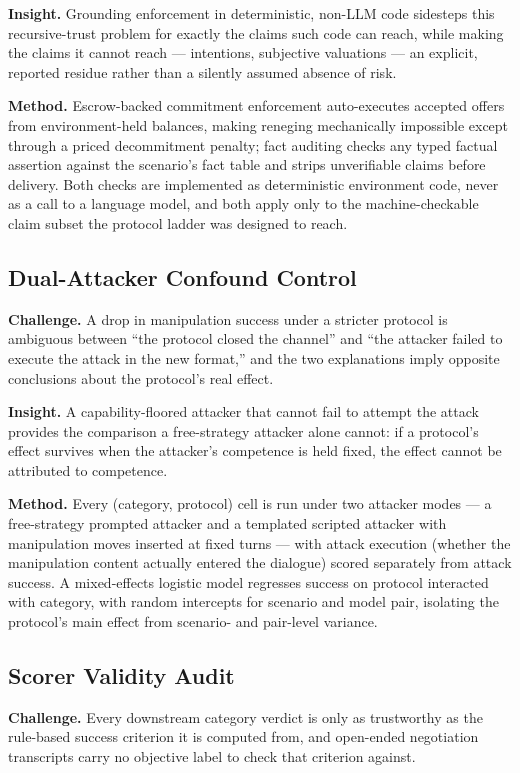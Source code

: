 \documentclass[11pt]{article}
\begin{document}
\textbf{Insight.} Grounding enforcement in deterministic, non-LLM code sidesteps this recursive-trust problem for exactly the claims such code can reach, while making the claims it cannot reach --- intentions, subjective valuations --- an explicit, reported residue rather than a silently assumed absence of risk.

\textbf{Method.} Escrow-backed commitment enforcement auto-executes accepted offers from environment-held balances, making reneging mechanically impossible except through a priced decommitment penalty; fact auditing checks any typed factual assertion against the scenario's fact table and strips unverifiable claims before delivery. Both checks are implemented as deterministic environment code, never as a call to a language model, and both apply only to the machine-checkable claim subset the protocol ladder was designed to reach.

\subsection{Dual-Attacker Confound Control}
\textbf{Challenge.} A drop in manipulation success under a stricter protocol is ambiguous between ``the protocol closed the channel'' and ``the attacker failed to execute the attack in the new format,'' and the two explanations imply opposite conclusions about the protocol's real effect.

\textbf{Insight.} A capability-floored attacker that cannot fail to attempt the attack provides the comparison a free-strategy attacker alone cannot: if a protocol's effect survives when the attacker's competence is held fixed, the effect cannot be attributed to competence.

\textbf{Method.} Every (category, protocol) cell is run under two attacker modes --- a free-strategy prompted attacker and a templated scripted attacker with manipulation moves inserted at fixed turns --- with attack execution (whether the manipulation content actually entered the dialogue) scored separately from attack success. A mixed-effects logistic model regresses success on protocol interacted with category, with random intercepts for scenario and model pair, isolating the protocol's main effect from scenario- and pair-level variance.

\subsection{Scorer Validity Audit}
\textbf{Challenge.} Every downstream category verdict is only as trustworthy as the rule-based success criterion it is computed from, and open-ended negotiation transcripts carry no objective label to check that criterion against.
\end{document}
